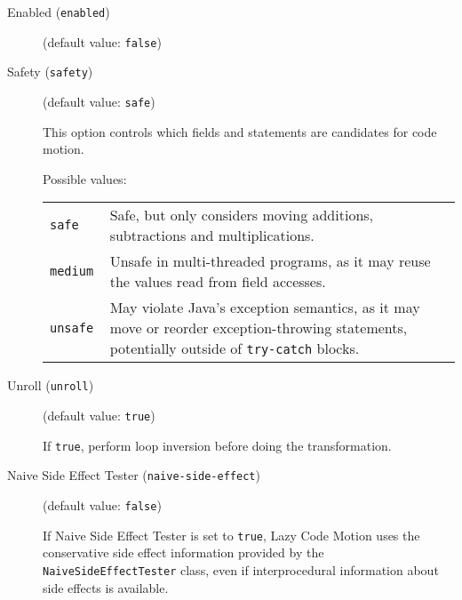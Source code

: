\documentclass{article}
\begin{document}
\begin{description}

\item[Enabled ({\tt enabled})]
(default value: {\tt false})






\item[Safety ({\tt safety})]
(default value: {\tt safe})




This option controls which fields and statements are candidates
for code motion.




Possible values:\\
\begin{longtable}{p{1in}p{4in}}

{\tt safe }
&

Safe, but only considers moving additions,
subtractions and multiplications.
\\

{\tt medium }
&

Unsafe in multi-threaded programs, as it may reuse the values
read from field accesses.
\\

{\tt unsafe }
&

May violate Java's exception semantics, as it may move or reorder
exception-throwing statements, potentially outside of
{\tt try-catch} blocks.
\\

\end{longtable}


\item[Unroll ({\tt unroll})]
(default value: {\tt true})




If {\tt true}, perform loop inversion before doing the
transformation.



\item[Naive Side Effect Tester ({\tt naive-side-effect})]
(default value: {\tt false})





\par

If Naive Side Effect Tester is set to {\tt true}, Lazy Code
Motion uses the conservative side effect information provided by
the {\tt NaiveSideEffectTester} class, even if interprocedural
information about side effects is available.


\end{description}
\end{document}
